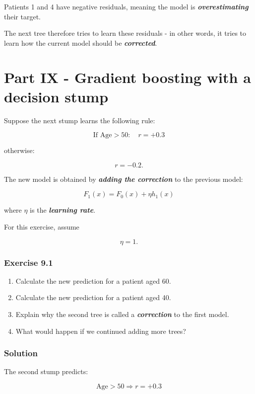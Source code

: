 \documentclass[10pt]{article}
\begin{document}
Patients 1 and 4 have negative residuals, meaning the model is \textbf{\textit{overestimating}} their target.

The next tree therefore tries to learn these residuals - in other words, it tries to learn how the current model should be \textbf{\textit{corrected}}.

\par\endgroup

\clearpage
\section*{Part IX - Gradient boosting with a decision stump}
Suppose the next stump learns the following rule:

\[
\text{If Age}>50:
\quad r=+0.3
\]

otherwise:

\[
r=-0.2.
\]

The new model is obtained by \textbf{\textit{adding the correction}} to the previous model:

\[
{
F_1(x)=F_0(x)+\eta h_1(x)
}
\]

where $\eta$ is the \textbf{\textit{learning rate}}.

For this exercise, assume

\[
\eta=1.
\]

\subsubsection*{Exercise 9.1}
\begin{enumerate}
\item
Calculate the new prediction for a patient aged 60.

\item
Calculate the new prediction for a patient aged 40.

\item
Explain why the second tree is called a \textbf{\textit{correction}} to the first model.

\item
What would happen if we continued adding more trees?

\end{enumerate}
\begingroup\color{red}

\subsubsection*{Solution}
The second stump predicts:

\[
\text{Age}>50
\Rightarrow r=+0.3
\]
\end{document}
